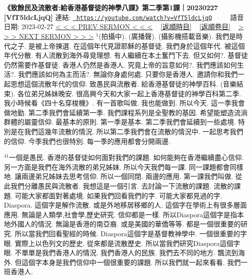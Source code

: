 \documentclass{book}
\begin{document}
\section{}
\label{sec:VfT5ldcLjqQ}
\textbf{《致餘民及流散者:給香港基督徒的神學八課》第二季第1課｜20230227 [VfT5ldcLjqQ]}
\newline
\newline
連結: \href{https://youtube.com/watch?v=VfT5ldcLjqQ}{\texttt{ https://youtube.com/watch?v=VfT5ldcLjqQ}} ~~~~ 語音日期: 2023-02-27 
\newline
\newline
\hyperref[sec:lsdGk_BkHa8]{\small{< < < PREV SERMON < < <}}
~
\hyperref[sec:index_chronic]{\small{[返順時目]}}
~
\hyperref[sec:index_scriptual]{\small{[返順卷目]}}
~
\hyperref[sec:dLJdySFiu9c]{\small{> > > NEXT SERMON > > >}}
\newline
\newline
$^{1}$(拍攝中).
(廣播聲).
(攝影機搭載音樂).
我們是時代之子.
是被上帝揀選.
在這個年代見證耶穌的基督徒.
我們身於這個年代.
被這個年代分散.
有人流散到海外尋覓理想.
有人繼續在本土奮鬥下去.
但又如何?.
基督徒仍然需要作基督徒.
香港人仍然是香港人.
究竟上帝的旨意如何?.
我們應該如何生活?.
我們應該如何為主而活?.
無論你身處何處.
只要你是香港人.
邀請你和我們一起思想這個流散年代的信仰.
致愚民與流散者.
給香港基督徒的神學百科.
(音樂結束).
各位弟兄姊妹晚安.
很高興今天和大家一起上香港基督徒的神學百科第二季.
我小時候看《四十名穿梭機》.
有一首歌叫做.
我也能做到.
所以今天.
這一季我會做地勤.
第二季我們會延續第一季.
我們課程系列是全聖教的基因.
希望能塑造流淌群體的屬靈信仰.
最基本的原則.
第一季是基本.
第二季我們會延續到一些處境.
特別是在我們這幾年流散的情況.
所以第二季我們會在流散的情況中.
一起思考我們的信仰.
今季我們也很特別.
每一季的應用都會分開兩邊.

$^{41}$一個是愚民.
香港的基督徒如何面對我們的課題.
如何能夠在香港繼續盡心信仰.
另一方面是我們在海外流散的弟兄姊妹.
所以今天我們每一課.
同一課題都會同樣地.
讓兩邊弟兄姊妹去思考信仰.
所以一個同閉.
兩邊的應用.
第一課我們叫做.
從此我們分離愚民與流散者.
我想這是一個引言.
去討論一下流散的課題.
流散的課題.
可能大家都面對著處境.
如果我們回看我們的字.
可能大家都見過的字.
Diaspora.
這個字是解作流散.
或是外地移居移鄉的人.
這個字在學術上有很多層面應用.
無論是人類學,社會學,歷史研究.
信仰都是一樣.
所以Diaspora這個字是指本地外國人的情況.
無論是香港的南亞裔.
或是美國的華僑等等.
都是一個很重要的研究.
所以當我們回看聖經的時候.
Diaspora這個字是基督教神學中.
一個很重要的字眼.
實際上以色列文的歷史.
從來都是流散歷史.
所以當我們研究Diaspora這個字眼.
不單單是我們香港人的情況.
我們香港人的民族.
我們去不同的地方.
飄流到海外.
但這個字本身是我們信仰中一個很重要的課題.
所以我們就一起來看看.
我們一班香港人.
\end{document}
